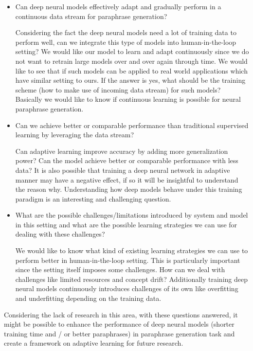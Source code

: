 \begin{itemize}
  \item Can deep neural models effectively adapt and gradually perform in a continuous data stream for paraphrase generation?

Considering the fact the deep neural models need a lot of training data to perform well, can we integrate this type of models into human-in-the-loop setting? We would like our model to learn and adapt continuously since we do not want to retrain large models over and over again through time. We would like to see that if such models can be applied to real world applications which have similar setting to ours. If the answer is yes, what should be the training scheme (how to make use of incoming data stream) for such models? Basically we would like to know if continuous learning is possible for neural paraphrase generation. 
 
  \item Can we achieve better or comparable performance than traditional supervised learning by leveraging the data stream?
  
  Can adaptive learning improve accuracy by adding more generalization power? Can the model achieve better or comparable performance with less data? It is also possible that training a deep neural network in adaptive manner may have a negative effect, if so it will be insightful to understand the reason why. Understanding how deep models behave under this training paradigm is an interesting and challenging question.
   
  \item What are the possible challenges/limitations introduced by system and model in this setting and what are the possible learning strategies we can use for dealing with these challenges?
  
  We would like to know what kind of existing learning strategies we can use to perform better in human-in-the-loop setting. This is particularly important since the setting itself imposes some challenges. How can we deal with challenges like limited resources and concept drift? Additionally training deep neural models continuously introduces challenges of its own like overfitting and underfitting depending on the training data.

\end{itemize}

Considering the lack of research in this area, with these questions answered, it might be possible to enhance the performance of deep neural models (shorter training time and / or better paraphrases) in paraphrase generation task and create a framework on adaptive learning for future research.

